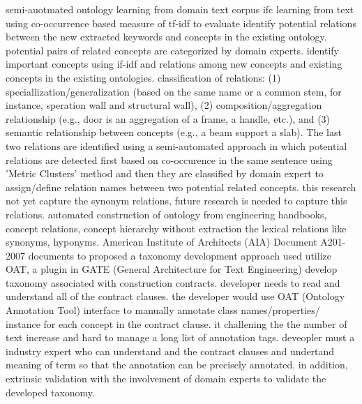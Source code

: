 \documentclass[Journal,InsideFigs, DoubleSpace]{ascelike} %
\begin{document}
{%
\cite{rezgui07} semi-auotmated ontology learning from domain text corpus ifc learning from text using co-occurrence based measure of tf-idf to evaluate identify potential relations between the new extracted keywords and concepts in the existing ontology. potential pairs of related concepts are categorized by domain experts. identify important concepts using if-idf and relations among new concepts and existing concepts in the existing ontologies. classification of relations: (1) speciallization/generalization (based on the same name or a common stem, for instance, speration wall and structural wall), (2) composition/aggregation relationship (e.g., door is an aggregation of a frame, a handle, etc.), and (3)  semantic relationship between concepts (e.g., a beam support a slab). The last two relations are identified using a semi-automated approach in which potential relations are detected first based on co-occurence in the same sentence using 'Metric Clusters' method and then they are classified by domain expert to assign/define relation names between two potential related concepts. this research not yet capture the synonym relations, future research is needed to capture this relations. 
\cite{hsieh11} automated construction of ontology from engineering handbooks, concept relations, concept hierarchy without extraction the lexical relations like synonyms, hyponyms.
\cite{niu15} American Institute of Architects (AIA) Document A201-2007 documents to proposed a taxonomy development approach used utilize OAT, a plugin in GATE (General Architecture for Text Engineering) develop taxonomy associated with construction contracts. developer needs to read and understand all of the contract clauses. the developer would use OAT (Ontology Annotation Tool) interface to manually annotate class names/properties/ instance for each concept in the contract clause. it challening the the number of text increase and hard to manage a long list of annotation tags. deveopler must a industry expert who can understand and the contract clauses and undertand meaning of term so that the annotation can be precisely annotated. in addition, extrinsic validation with the involvement of domain experts to validate the developed taxonomy. 
%
}
\end{document}
